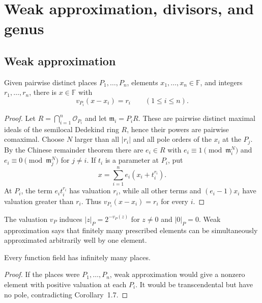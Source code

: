 \chapter{Weak approximation, divisors, and genus}
\label{par-chap-divisors}

\section{Weak approximation}
\begin{theorem}
\label{par-thm-weak-approximation}
\uses{}
Given pairwise distinct places $P_1,\ldots,P_n$, elements $x_1,\ldots,x_n\in\mathbb F$,
and integers $r_1,\ldots,r_n$, there is $x\in\mathbb F$ with
\[
v_{P_i}(x-x_i)=r_i\qquad(1\leq i\leq n).
\]
\end{theorem}
\begin{proof}
Let $R=\bigcap_{i=1}^n\mathcal O_{P_i}$ and let
$\mathfrak m_i=P_iR$.  These are pairwise distinct maximal ideals of the
semilocal Dedekind ring $R$, hence their powers are pairwise comaximal.  Choose
$N$ larger than all $|r_i|$ and all pole orders of the $x_i$ at the $P_j$.
By the Chinese remainder theorem there are $e_i\in R$ with
$e_i\equiv1\pmod{\mathfrak m_i^N}$ and
$e_i\equiv0\pmod{\mathfrak m_j^N}$ for $j\ne i$.  If $t_i$ is a parameter at
$P_i$, put
\[
x=\sum_{i=1}^n e_i(x_i+t_i^{r_i}).
\]
At $P_i$, the term $e_it_i^{r_i}$ has valuation $r_i$, while all other terms
and $(e_i-1)x_i$ have valuation greater than $r_i$.  Thus
$v_{P_i}(x-x_i)=r_i$ for every $i$.
\end{proof}

\begin{remark}
\label{par-rem-weak-approximation-absolute-value}
\uses{}
The valuation $v_P$ induces $|z|_P=2^{-v_P(z)}$ for $z\neq0$ and $|0|_P=0$.
Weak approximation says that finitely many prescribed elements can be
simultaneously approximated arbitrarily well by one element.
\end{remark}

\begin{corollary}
\label{par-cor-infinitely-many-places}
\uses{}
Every function field has infinitely many places.
\end{corollary}
\begin{proof}
If the places were $P_1,\ldots,P_n$, weak approximation would give a nonzero
element with positive valuation at each $P_i$. It would be transcendental but
have no pole, contradicting Corollary~1.7.
\end{proof}

